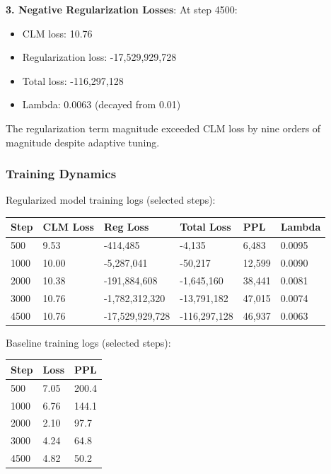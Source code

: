 \textbf{3. Negative Regularization Losses}: At step 4500:
\begin{itemize}
\item CLM loss: 10.76
\item Regularization loss: -17,529,929,728
\item Total loss: -116,297,128
\item Lambda: 0.0063 (decayed from 0.01)
\end{itemize}

The regularization term magnitude exceeded CLM loss by nine orders of magnitude despite adaptive tuning.

\subsubsection{Training Dynamics}

Regularized model training logs (selected steps):

\begin{table}[htbp]
\centering
\begin{tabular}{llllll}
\toprule
Step & CLM Loss & Reg Loss & Total Loss & PPL & Lambda \\
\midrule
500 & 9.53 & -414,485 & -4,135 & 6,483 & 0.0095 \\
1000 & 10.00 & -5,287,041 & -50,217 & 12,599 & 0.0090 \\
2000 & 10.38 & -191,884,608 & -1,645,160 & 38,441 & 0.0081 \\
3000 & 10.76 & -1,782,312,320 & -13,791,182 & 47,015 & 0.0074 \\
4500 & 10.76 & -17,529,929,728 & -116,297,128 & 46,937 & 0.0063 \\
\bottomrule
\end{tabular}
\end{table}

Baseline training logs (selected steps):

\begin{table}[htbp]
\centering
\begin{tabular}{lll}
\toprule
Step & Loss & PPL \\
\midrule
500 & 7.05 & 200.4 \\
1000 & 6.76 & 144.1 \\
2000 & 2.10 & 97.7 \\
3000 & 4.24 & 64.8 \\
4500 & 4.82 & 50.2 \\
\bottomrule
\end{tabular}
\end{table}
